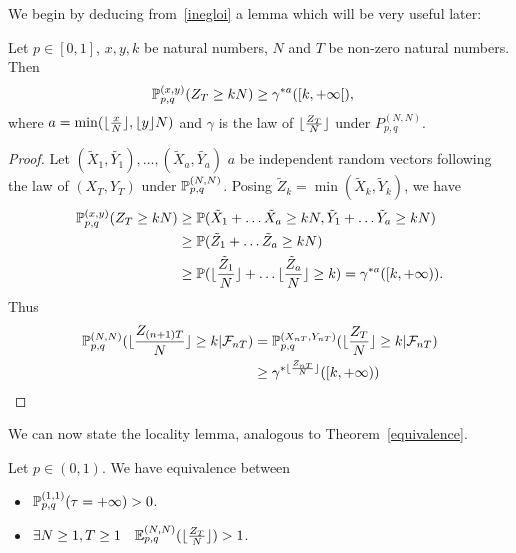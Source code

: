 We begin by deducing from~\eqref{inegloi} a lemma which will be very useful later:
\begin{lemme}\label{grandpas}
  Let $p\in [0,1]$, $x,y,k$ be natural numbers, $N$ and $T$ be non-zero natural numbers.
  Then
  \begin{align*} \P_{p,q}^{(x,y)}(Z_T\ge kN)&\ge \gamma^{*a}([k,+\infty[),
  \end{align*}
  where $a=\min(\floor{\frac{x}N},\floor{y}N)$ and $\gamma$ 
  is the law of $\floor{\frac{Z_{T}}{N}}$ under $P_{p,q}^{(N,N)}$.
\end{lemme}

\begin{proof}
 Let $(\tilde{X}_1,\tilde{Y_1}),\dots, (\tilde{X}_a,\tilde{Y_a})$ $a$ be independent random vectors following the law of $(X_T,Y_T)$ under $\P_{p,q}^{(N,N)}$.
 Posing $\tilde{Z}_k=\min(\tilde{X}_k,\tilde{Y}_k)$, we have
\begin{align*}
    \P_{p,q}^{(x,y)}(Z_T\ge kN)&\ge \P(\tilde{X}_1+\dots \tilde{X}_a\ge kN,\tilde{Y}_1+\dots \tilde{Y}_a\ge kN)\\
    &\ge \P(\tilde{Z}_1+\dots \tilde{Z}_a\ge kN)\\
    &\ge \P( \floor{\frac{\tilde{Z}_1}N}+\dots \floor{\frac{\tilde{Z}_a}N}\ge k) =\gamma^{*a}([k,+\infty)).
  \end{align*}
  Thus
  \begin{align*}
     \P_{p,q}^{(N,N)}(\floor{\frac{Z_{(n+1)T}}{N}}\ge k|\mathcal{F}_{nT})&= \P_{p,q}^{(X_{nT},Y_{nT})}(\floor{\frac{Z_{T}}{N}}\ge k|\mathcal{F}_{nT})\\ &\ge \gamma^{* \floor{\frac{Z_{nT}}{N}} }([k,+\infty))
  \end{align*}    
  
\end{proof}

We can now state the locality lemma, analogous to Theorem~\ref{equivalence}.

\begin{lemme}
  \label{leqvencore}
  Let $p\in (0,1)$. We have equivalence between
  \begin{itemize}
  \item $\P_{p,q}^{(1,1)}(\tau=+\infty)>0$.
  \item $\exists N\ge 1,T\ge 1\quad \E_{p,q}^{(N,N)}(\floor{\frac{Z_T}N})>1$.  
  \end{itemize}
\end{lemme}


